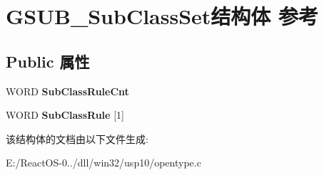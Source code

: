 \hypertarget{struct_g_s_u_b___sub_class_set}{}\section{G\+S\+U\+B\+\_\+\+Sub\+Class\+Set结构体 参考}
\label{struct_g_s_u_b___sub_class_set}
\subsection*{Public 属性}
\begin{DoxyCompactItemize}
\item 
\mbox{\label{struct_g_s_u_b___sub_class_set_a576b316e49565ddd104fb09bbf8eb279}} 
W\+O\+RD {\bfseries Sub\+Class\+Rule\+Cnt}
\item 
\mbox{\label{struct_g_s_u_b___sub_class_set_ac526da965341eca0a3f5e264ae6946f3}} 
W\+O\+RD {\bfseries Sub\+Class\+Rule} \mbox{[}1\mbox{]}
\end{DoxyCompactItemize}


该结构体的文档由以下文件生成\+:\begin{DoxyCompactItemize}
\item 
E\+:/\+React\+O\+S-\/0../dll/win32/usp10/opentype.\+c\end{DoxyCompactItemize}
